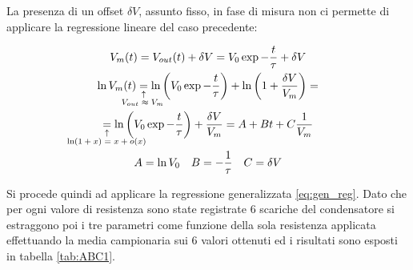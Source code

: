\documentclass{article}
\newcommand{\equalexpl}[1]{
	\underset{\substack{\uparrow\\\mathrlap{\text{#1}}}}{=}}
\begin{document}
La presenza di un offset $\delta V$, assunto fisso, in fase di misura non ci permette di applicare la regressione lineare del caso precedente: 

\begin{gather}
	\nonumber
	V_m(t) = V_{out}(t) + \delta V =  V_0 \exp{ -\frac{t}{\tau} } + \delta V
	\\
	\nonumber
	\ln{V_m(t)} \equalexpl{\hspace{-2.5em}$V_{out} \approx V_m$} 
	\ln{\left( V_0 \exp{ -\frac{t}{\tau} } \right) } + 
	\ln{\left( 1 + \frac {\delta V}{V_{m}} \right) } = 
	\\
	\nonumber
	\equalexpl{\hspace{-4.5em}$\ln(1+x) = x + o(x)$} 
	\ln{\left( V_0 \exp{ -\frac{t}{\tau} } \right) } + 
	\frac {\delta V}{V_m} = A + B t + C\frac{1}{V_m}
	\\
	A = \ln{V_0} \quad B = -\frac{1}{\tau} \quad C = \delta V
	\label{eq:gen_reg}
\end{gather}  

Si procede quindi ad applicare la regressione generalizzata \ref{eq:gen_reg}. Dato che per ogni valore di resistenza sono state registrate 6 scariche del condensatore si estraggono poi i tre  parametri come funzione della sola resistenza applicata effettuando la media campionaria sui 6 valori ottenuti ed i risultati sono esposti in tabella \ref{tab:ABC1}.
\end{document}
